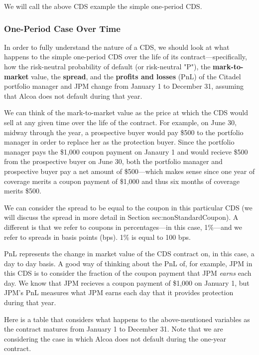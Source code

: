 \documentclass[article]{jss}
\begin{document}
We will call the above CDS example the simple one-period CDS.

\subsubsection{One-Period Case Over Time}
\label{sec:OnePeriodOverTime}

In order to fully understand the nature of a CDS, we should look at what happens to the simple one-period CDS over the life of its contract---specifically, how the risk-neutral probability of default (or risk-neutral "P"), the \textbf{mark-to-market} value, the \textbf{spread}, and the \textbf{profits and losses} (PnL) of the Citadel portfolio manager and JPM change from January 1 to December 31, assuming that Alcoa does not default during that year.

We can think of the mark-to-market value as the price at which the CDS would sell at any given time over the life of the contract. For example, on June 30, midway through the year, a prospective buyer would pay \$500 to the portfolio manager in order to replace her as the protection buyer. Since the portfolio manager pays the \$1,000 coupon payment on Janaury 1 and would recieve \$500 from the prospective buyer on June 30, both the portfolio manager and prospective buyer pay a net amount of \$500---which makes sense since one year of coverage merits a coupon payment of \$1,000 and thus six months of coverage merits \$500. 

We can consider the spread to be equal to the coupon in this particular CDS (we will discuss the spread in more detail in Section {sec:nonStandardCoupon}). A different is that we refer to coupons in percentages---in this case, 1\%---and we refer to spreads in basis points (bps). 1\% is equal to 100 bps.

PnL represents the change in market value of the CDS contract on, in this case, a day to day basis. A good way of thinking about the PnL of, for example, JPM in this CDS is to consider the fraction of the coupon payment that JPM \emph{earns} each day. We know that JPM recieves a coupon payment of \$1,000 on January 1, but JPM's PnL measures what JPM earns each day that it provides protection during that year.

Here is a table that considers what happens to the above-mentioned variables as the contract matures from January 1 to December 31. Note that we are considering the case in which Alcoa does not default during the one-year contract.
\end{document}
